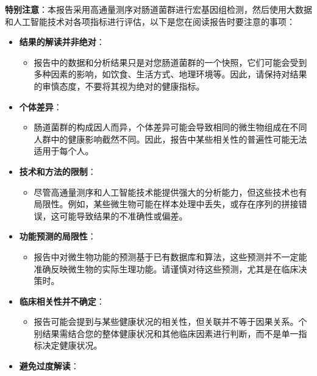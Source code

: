 \documentclass[UTF8]{ctexart}
\begin{document}
\begin{tcolorbox}[
    enhanced,
    colback=lightpurple!10, %
    colframe=white,  %
    arc=3mm,
    boxrule=0.5pt,
    width=\textwidth,
    top=8pt,
    bottom=8pt
]
{\normalsize{\color{orange}\faExclamationTriangle}
\textbf{特别注意}：本报告采用高通量测序对肠道菌群进行宏基因组检测，然后使用大数据和人工智能技术对各项指标进行评估，以下是您在阅读报告时要注意的事项：
\begin{itemize}

    \item \textbf{结果的解读并非绝对}：
    \begin{itemize}
        \item 报告中的数据和分析结果只是对您肠道菌群的一个快照，它们可能会受到多种因素的影响，如饮食、生活方式、地理环境等。因此，请保持对结果的审慎态度，不要将其视为绝对的健康指标。
    \end{itemize}
    \item \textbf{个体差异}：
    \begin{itemize}
        \item 肠道菌群的构成因人而异，个体差异可能会导致相同的微生物组成在不同人群中的健康影响截然不同。因此，报告中某些相关性的普遍性可能无法适用于每个人。
    \end{itemize}
    \item \textbf{技术和方法的限制}：
    \begin{itemize}
        \item 尽管高通量测序和人工智能技术能提供强大的分析能力，但这些技术也有局限性。例如，某些微生物可能在样本处理中丢失，或存在序列的拼接错误，这可能导致结果的不准确性或偏差。
    \end{itemize}
    \item \textbf{功能预测的局限性}：
    \begin{itemize}
        \item 报告中对微生物功能的预测基于已有数据库和算法，这些预测并不一定能准确反映微生物的实际生理功能。请谨慎对待这些预测，尤其是在临床决策时。
    \end{itemize}
    \item \textbf{临床相关性并不确定}：
    \begin{itemize}
        \item 报告可能会提到与某些健康状况的相关性，但关联并不等于因果关系。个别结果需结合您的整体健康状况和其他临床因素进行判断，而不是单一指标决定健康状况。
    \end{itemize}
    \item \textbf{避免过度解读}：

\end{itemize}}
\end{tcolorbox}
\end{document}
